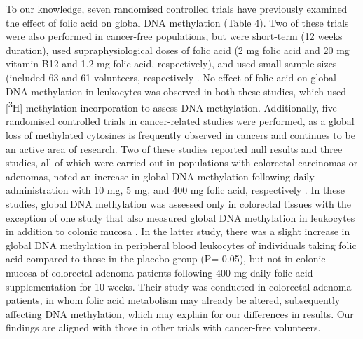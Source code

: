 \noindent To our knowledge, seven randomised controlled trials have previously examined the effect of folic acid on global DNA methylation (Table 4). Two of these trials were also performed in cancer-free populations, but were short-term (12 weeks duration), used supraphysiological doses of folic acid (2 mg folic acid and 20 mg vitamin B12 and 1.2 mg folic acid, respectively), and used small sample sizes (included 63 and 61 volunteers, respectively \cite{c434,c435}. No effect of folic acid on global DNA methylation in leukocytes was observed in both these studies, which used [\textsuperscript{3}H] methylation incorporation to assess DNA methylation. Additionally, five randomised controlled trials in cancer-related studies were performed, as a global loss of methylated cytosines is frequently observed in cancers \cite{c436} and continues to be an active area of research. Two of these studies reported null results \cite{c437,c438} and three studies, all of which were carried out in populations with colorectal carcinomas or 
adenomas, noted an increase in global DNA methylation following daily administration with 10 mg, 5 mg, and 400 mg folic acid, respectively \cite{c439,c440,c441}. In these studies, global DNA methylation was assessed only in colorectal tissues with the exception of one study that also measured global DNA methylation in leukocytes in addition to colonic mucosa \cite{c441}. In the latter study, there was a slight increase in global DNA methylation in peripheral blood leukocytes of individuals taking folic acid compared to those in the placebo group (P= 0.05), but not in colonic mucosa of colorectal adenoma patients following 400 mg daily folic acid supplementation for 10 weeks. Their study was conducted in colorectal adenoma patients, in whom folic acid metabolism may already be altered, subsequently affecting DNA methylation, which may explain for our differences in results. Our findings are aligned with those in other trials with cancer-free volunteers.

